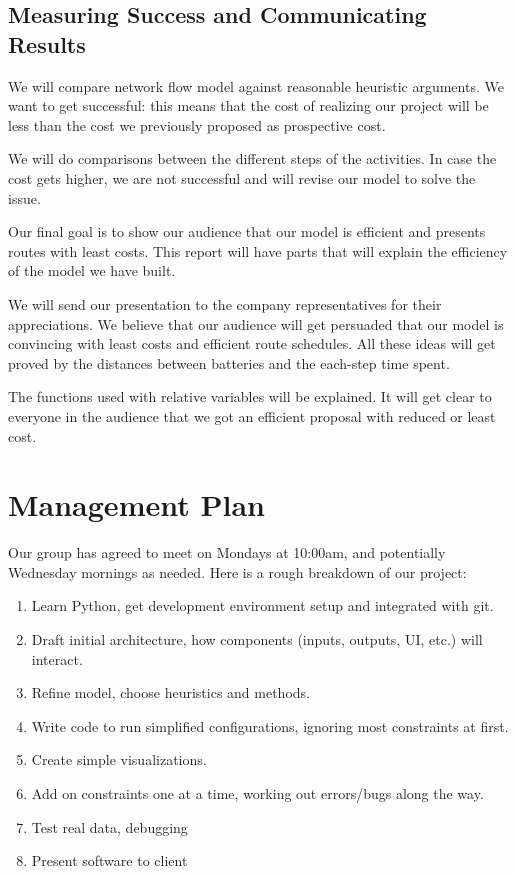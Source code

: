 \documentclass{article}
\begin{document}
\subsection{Measuring Success and Communicating Results}
We will compare network flow model against reasonable heuristic arguments. We want to get successful: this means that the cost of realizing our project will be less than the cost we previously proposed as prospective cost.

We will do comparisons between the different steps of the activities. In case the cost gets higher, we are not successful and will revise our model to solve the issue.

Our final goal is to show our audience that our model is efficient and presents routes with least costs. This report will have parts that will explain the efficiency of the model we have built.

We will send our presentation to the company representatives for their appreciations. We believe that our audience will get persuaded that our model is convincing with least costs and efficient route schedules. All these ideas will get proved by the distances between batteries and the each-step time spent.

The functions used with relative variables will be explained. It will get clear to everyone in the audience that we got an efficient proposal with reduced or least cost.

\section{Management Plan}
Our group has agreed to meet on Mondays at 10:00am, and potentially Wednesday mornings as needed. Here is a rough breakdown of our project:

\begin{enumerate}
	\item Learn Python, get development environment setup and integrated with git.
	\item Draft initial architecture, how components (inputs, outputs, UI, etc.) will interact.
	\item Refine model, choose heuristics and methods.
	\item Write code to run simplified configurations, ignoring most constraints at first.
	\item Create simple visualizations.
	\item Add on constraints one at a time, working out errors/bugs along the way.
	\item Test real data, debugging
	\item Present software to client
\end{enumerate}
\end{document}
